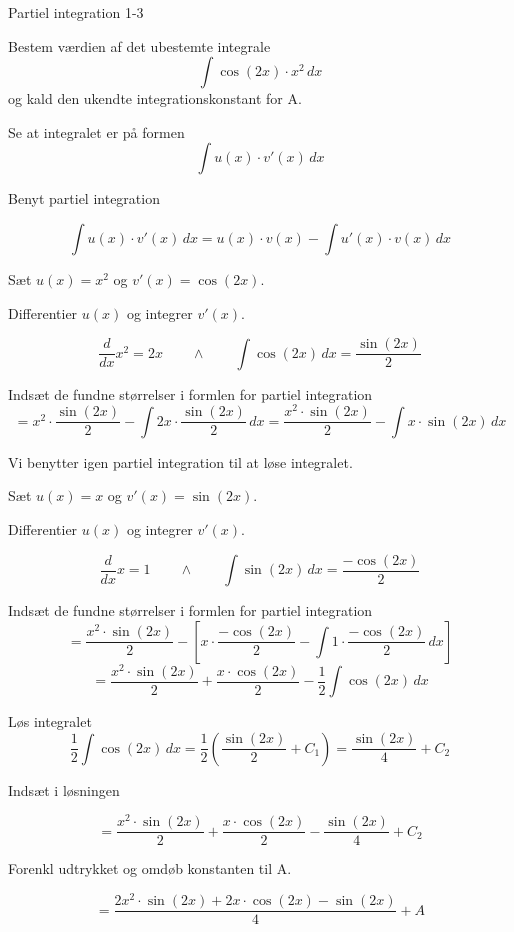 \documentclass{article}
\begin{document}
\newpage

\begin{exercise}{Partiel integration 1-3}


Bestem værdien af det ubestemte integrale
\[
\int \cos(2x) \cdot x^2 \, dx
\]
og kald den ukendte integrationskonstant for A.



\hint

Se at integralet er på formen
\[
\int u(x) \cdot v'(x) \, dx
\]

\hint

Benyt partiel integration

\hint
\[
\int u(x) \cdot v'(x)\, dx = u(x) \cdot v(x) - \int u'(x) \cdot v(x) \, dx
\]
\hint

Sæt $u(x) = x^2$ og $v'(x) = \cos(2x)$.


\hint

Differentier $u(x)$ og integrer $v'(x)$.

\hint
\[
\frac{d}{dx}x^2 = 2x \qquad \wedge \qquad \int \cos(2x) \, dx = \frac{\sin(2x)}{2}
\]

\hint

Indsæt de fundne størrelser i formlen for partiel integration
\[
= x^2 \cdot \frac{\sin(2x)}{2} - \int 2x \cdot \frac{\sin(2x)}{2} \, dx = \frac{x^2 \cdot \sin(2x)}{2} - \int x \cdot \sin(2x) \, dx
\]

\hint

Vi benytter igen partiel integration til at løse integralet.

\hint

Sæt $u(x) = x$ og $v'(x) = \sin(2x)$.


\hint

Differentier $u(x)$ og integrer $v'(x)$.

\hint
\[
\frac{d}{dx}x = 1 \qquad \wedge \qquad \int \sin(2x) \, dx = \frac{ - \cos(2x)}{2}
\]

\hint

Indsæt de fundne størrelser i formlen for partiel integration
\[
= \frac{x^2 \cdot \sin(2x)}{2} - \left[ x \cdot \frac{ - \cos(2x)}{2} - \int 1 \cdot \frac{ - \cos(2x)}{2} \, dx \right]
\]
\[
= \frac{x^2 \cdot \sin(2x)}{2} + \frac{x \cdot \cos(2x)}{2} - \frac{1}{2}\int \cos(2x)\, dx
\]

\hint
Løs integralet
\[
\frac{1}{2} \int \cos(2x) \, dx = \frac{1}{2} \left(\frac{\sin(2x)}{2} + C_1\right) = \frac{\sin(2x)}{4} + C_2
\]

\hint
Indsæt i løsningen

\hint

\[
= \frac{x^2 \cdot \sin(2x)}{2} + \frac{x \cdot \cos(2x)}{2} - \frac{\sin(2x)}{4} + C_2
\]

\hint

Forenkl udtrykket og omdøb konstanten til A.

\hint

\[
= \frac{2x^2 \cdot \sin(2x)+2x\cdot \cos(2x) - \sin(2x)}{4} + A
\]


\end{exercise}
\end{document}

